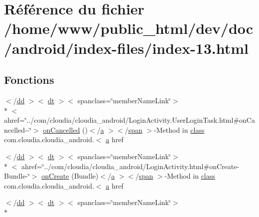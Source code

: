 \hypertarget{index-13_8html}{\section{Référence du fichier /home/www/public\-\_\-html/dev/doc/android/index-\/files/index-\/13.html}
\label{index-13_8html}
}
\subsection*{Fonctions}
\begin{DoxyCompactItemize}
\item 
$<$/\hyperlink{stylesheet_8css_a47f4718a86835a7771ec592ece845221}{dd} $>$$<$ \hyperlink{stylesheet_8css_a107565fb4039d33b041380d6e0ea1d80}{dt} $>$$<$ spanclass=\char`\"{}member\-Name\-Link\char`\"{}$>$\\*
$<$ ahref=\char`\"{}../com/cloudia/cloudia\-\_\-android/Login\-Activity.\-User\-Login\-Task.\-html\#on\-Cancelled-\/-\/\char`\"{}$>$ \hyperlink{index-13_8html_a04d348020f59415eedb374ec50d1c1d3}{on\-Cancelled} ()$<$/\hyperlink{style_8css_a5e8981582017bb8b84c21f148345d1f7}{a} $>$$<$/\hyperlink{stylesheet_8css_a8343996ebcf16220b04e54659aac31cc}{span} $>$-\/Method in \hyperlink{_tools_8html_acf06f836132665ba8114f5a414c2403f}{class} com.\-cloudia.\-cloudia\-\_\-android.$<$ \hyperlink{style_8css_a5e8981582017bb8b84c21f148345d1f7}{a} href
\item 
$<$/\hyperlink{stylesheet_8css_a47f4718a86835a7771ec592ece845221}{dd} $>$$<$ \hyperlink{stylesheet_8css_a107565fb4039d33b041380d6e0ea1d80}{dt} $>$$<$ spanclass=\char`\"{}member\-Name\-Link\char`\"{}$>$\\*
$<$ ahref=\char`\"{}../com/cloudia/cloudia\-\_\-android/Login\-Activity.\-html\#on\-Create-\/Bundle-\/\char`\"{}$>$ \hyperlink{index-13_8html_a201cf5f90dcdaa4e219d71595ac5a991}{on\-Create} (Bundle)$<$/\hyperlink{style_8css_a5e8981582017bb8b84c21f148345d1f7}{a} $>$$<$/\hyperlink{stylesheet_8css_a8343996ebcf16220b04e54659aac31cc}{span} $>$-\/Method in \hyperlink{_tools_8html_acf06f836132665ba8114f5a414c2403f}{class} com.\-cloudia.\-cloudia\-\_\-android.$<$ \hyperlink{style_8css_a5e8981582017bb8b84c21f148345d1f7}{a} href
\item 
$<$/\hyperlink{stylesheet_8css_a47f4718a86835a7771ec592ece845221}{dd} $>$$<$ \hyperlink{stylesheet_8css_a107565fb4039d33b041380d6e0ea1d80}{dt} $>$$<$ spanclass=\char`\"{}member\-Name\-Link\char`\"{}$>$\\*

\end{DoxyCompactItemize}
